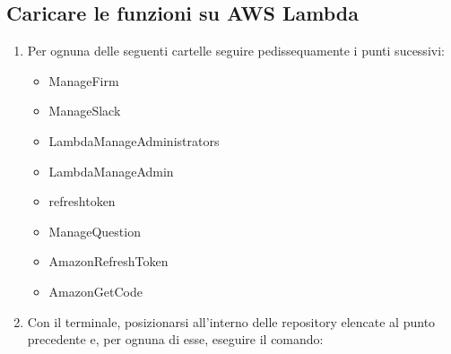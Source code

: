 \documentclass[../ManualeSviluppatore_v2.0.0.tex]{subfiles}
\begin{document}
	\subsection{Caricare le funzioni su AWS Lambda}
		\begin{enumerate}
			\item Per ognuna delle seguenti cartelle seguire pedissequamente i punti sucessivi:
				\begin{itemize}
				\item ManageFirm
				\item ManageSlack
				\item LambdaManageAdministrators
				\item LambdaManageAdmin
				\item refreshtoken
				\item ManageQuestion
				\item AmazonRefreshToken
				\item AmazonGetCode
				\end{itemize}

			\item Con il terminale, posizionarsi all'interno delle repository elencate al punto precedente e, per ognuna di esse, eseguire il comando:
			\begin{center}

\end{center}
\end{enumerate}
\end{document}
